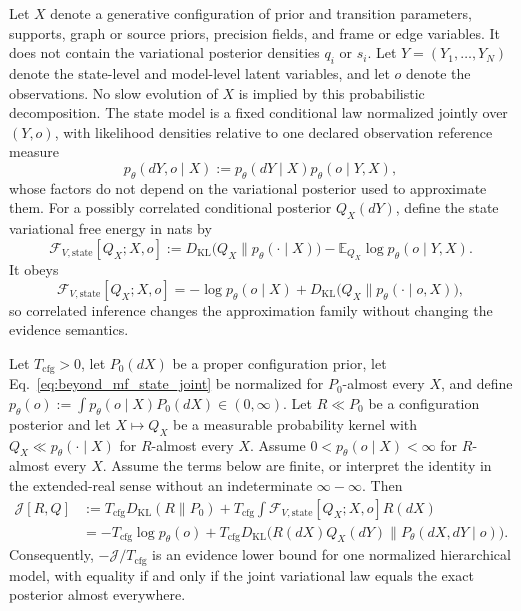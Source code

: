 Let $X$ denote a generative configuration of prior and transition parameters, supports, graph or source priors, precision fields, and frame or edge variables. It does not contain the variational posterior densities $q_i$ or $s_i$. Let $Y=(Y_1,\ldots,Y_N)$ denote the state-level and model-level latent variables, and let $o$ denote the observations. No slow evolution of $X$ is implied by this probabilistic decomposition. The state model is a fixed conditional law normalized jointly over $(Y,o)$, with likelihood densities relative to one declared observation reference measure
\begin{equation}
p_\theta(dY,o\mid X)
:=p_\theta(dY\mid X)p_\theta(o\mid Y,X),
\label{eq:beyond_mf_state_joint}
\end{equation}
whose factors do not depend on the variational posterior used to approximate them. For a possibly correlated conditional posterior $Q_X(dY)$, define the state variational free energy in nats by
\begin{equation}
\mathcal F_{V,\mathrm{state}}[Q_X;X,o]
:=D_{\mathrm{KL}}\bigl(Q_X\|p_\theta(\cdot\mid X)\bigr)
-\mathbb{E}_{Q_X}\log p_\theta(o\mid Y,X).
\label{eq:beyond_mf_state_vfe}
\end{equation}
It obeys
\begin{equation}
\mathcal F_{V,\mathrm{state}}[Q_X;X,o]
=-\log p_\theta(o\mid X)
+D_{\mathrm{KL}}\bigl(Q_X\|p_\theta(\cdot\mid o,X)\bigr),
\label{eq:beyond_mf_state_elbo_identity}
\end{equation}
so correlated inference changes the approximation family without changing the evidence semantics.

\begin{theorem}
\label{thm:nested_state_configuration_vfe}
Let $T_{\mathrm{cfg}}>0$, let $P_0(dX)$ be a proper configuration prior, let Eq.~\eqref{eq:beyond_mf_state_joint} be normalized for $P_0$-almost every $X$, and define $p_\theta(o):=\int p_\theta(o\mid X)P_0(dX)\in(0,\infty)$. Let $R\ll P_0$ be a configuration posterior and let $X\mapsto Q_X$ be a measurable probability kernel with $Q_X\ll p_\theta(\cdot\mid X)$ for $R$-almost every $X$. Assume $0<p_\theta(o\mid X)<\infty$ for $R$-almost every $X$. Assume the terms below are finite, or interpret the identity in the extended-real sense without an indeterminate $\infty-\infty$. Then
\begin{align}
\mathcal{J}[R,Q]
&:=T_{\mathrm{cfg}}D_{\mathrm{KL}}(R\|P_0)
+T_{\mathrm{cfg}}\int
\mathcal F_{V,\mathrm{state}}[Q_X;X,o]R(dX)
\nonumber\\
&=-T_{\mathrm{cfg}}\log p_\theta(o)
+T_{\mathrm{cfg}}D_{\mathrm{KL}}
\bigl(R(dX)Q_X(dY)\|P_\theta(dX,dY\mid o)\bigr).
\label{eq:nested_state_configuration_identity}
\end{align}
Consequently, $-\mathcal{J}/T_{\mathrm{cfg}}$ is an evidence lower bound for one normalized hierarchical model, with equality if and only if the joint variational law equals the exact posterior almost everywhere.
\end{theorem}

